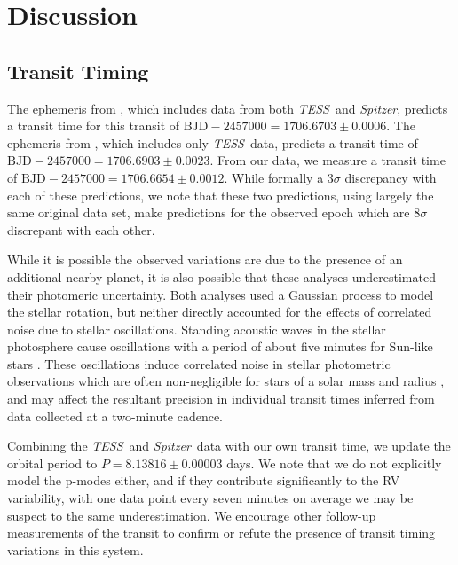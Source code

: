 \documentclass[twocolumn]{aastex63}
\newcommand{\tess}{{\it TESS}}
\newcommand{\spitz}{{\it Spitzer}}
\begin{document}
\section{Discussion}
\label{sec:discussion}




\subsection{Transit Timing}

The ephemeris from \citet{Newton19}, which includes data from both \tess\ and \spitz, predicts a transit time for this transit of $\textrm{BJD}- 2457000 = 1706.6703 \pm 0.0006$. 
The ephemeris from \citet{Benatti19}, which includes only \tess\ data, predicts a transit time of  $\textrm{BJD}- 2457000 = 1706.6903 \pm 0.0023$. 
From our data, we measure a transit time of $\textrm{BJD}- 2457000 = 1706.6654 \pm  0.0012$. 
While formally a $3\sigma$ discrepancy with each of these predictions, we note that these two predictions, using largely the same original data set, make predictions for the observed epoch which are $8\sigma$ discrepant with each other. 

While it is possible the observed variations are due to the presence of an additional nearby planet, it is also possible that these analyses underestimated their photomeric uncertainty. 
Both analyses used a Gaussian process to model the stellar rotation, but neither directly accounted for the effects of correlated noise due to stellar oscillations.
Standing acoustic waves in the stellar photosphere cause oscillations with a period of about five minutes for Sun-like stars \citep{Deubner75}. These oscillations  induce correlated noise in stellar photometric observations which are often non-negligible for stars of a solar mass and radius \citep{Chaplin13}, and may affect the resultant precision in individual transit times inferred from data collected at a two-minute cadence. 



Combining the \tess\ and \spitz\ data with our own transit time, we update the orbital period to $P= 8.13816 \pm 0.00003$ days. 
We note that we do not explicitly model the p-modes either, and if they contribute significantly to the RV variability, with one data point every seven minutes on average we may be suspect to the same underestimation.
We encourage other follow-up measurements of the transit to confirm or refute the presence of transit timing variations in this system.
\end{document}
